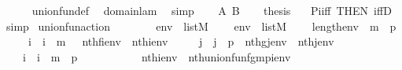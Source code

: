 \begin{isabellebody}
\ \ \ \ \isamarkupfalse%
\ union{\isacharunderscore}{\kern0pt}fun{\isacharunderscore}{\kern0pt}def\ \isamarkupfalse%
\ domain{\isacharunderscore}{\kern0pt}lam\ \isamarkupfalse%
\ simp\isanewline
\ \ \isamarkupfalse%
\ A\ B\isanewline
\ \ \isamarkupfalse%
\ {\isacharquery}{\kern0pt}thesis\ \isamarkupfalse%
\ \ Pi{\isacharunderscore}{\kern0pt}iff\ {\isacharbrackleft}{\kern0pt}THEN\ iffD{}{\isacharbrackright}{\kern0pt}\ \isamarkupfalse%
\ simp\isanewline
{}\isamarkupfalse%
%
\endisatagproof
{\isafoldproof}%
%
\isadelimproof
\isanewline
%
\endisadelimproof
\isanewline
{}\isamarkupfalse%
\ union{\isacharunderscore}{\kern0pt}fun{\isacharunderscore}{\kern0pt}action\ {\isacharcolon}{\kern0pt}\isanewline
\ \ \isanewline
\ \ \ \ {\isachardoublequoteopen}env\ {\isasymin}\ list{\isacharparenleft}{\kern0pt}M{\isacharparenright}{\kern0pt}{\isachardoublequoteclose}\isanewline
\ \ \ \ {\isachardoublequoteopen}env{\isacharprime}{\kern0pt}\ {\isasymin}\ list{\isacharparenleft}{\kern0pt}M{\isacharparenright}{\kern0pt}{\isachardoublequoteclose}\isanewline
\ \ \ \ {\isachardoublequoteopen}length{\isacharparenleft}{\kern0pt}env{\isacharparenright}{\kern0pt}\ {\isacharequal}{\kern0pt}\ m\ {\isasymunion}\ p{\isachardoublequoteclose}\isanewline
\ \ \ \ {\isachardoublequoteopen}{\isasymforall}\ i\ {\isachardot}{\kern0pt}\ i\ {\isasymin}\ m\ {\isasymlongrightarrow}\ \ nth{\isacharparenleft}{\kern0pt}f{\isacharbackquote}{\kern0pt}i{\isacharcomma}{\kern0pt}env{\isacharprime}{\kern0pt}{\isacharparenright}{\kern0pt}\ {\isacharequal}{\kern0pt}\ nth{\isacharparenleft}{\kern0pt}i{\isacharcomma}{\kern0pt}env{\isacharparenright}{\kern0pt}{\isachardoublequoteclose}\isanewline
\ \ \ \ {\isachardoublequoteopen}{\isasymforall}\ j\ {\isachardot}{\kern0pt}\ j\ {\isasymin}\ p\ {\isasymlongrightarrow}\ nth{\isacharparenleft}{\kern0pt}g{\isacharbackquote}{\kern0pt}j{\isacharcomma}{\kern0pt}env{\isacharprime}{\kern0pt}{\isacharparenright}{\kern0pt}\ {\isacharequal}{\kern0pt}\ nth{\isacharparenleft}{\kern0pt}j{\isacharcomma}{\kern0pt}env{\isacharparenright}{\kern0pt}{\isachardoublequoteclose}\isanewline
\ \ \ {\isachardoublequoteopen}{\isasymforall}\ i\ {\isachardot}{\kern0pt}\ i\ {\isasymin}\ m\ {\isasymunion}\ p\ {\isasymlongrightarrow}\isanewline
\ \ \ \ \ \ \ \ \ \ nth{\isacharparenleft}{\kern0pt}i{\isacharcomma}{\kern0pt}env{\isacharparenright}{\kern0pt}\ {\isacharequal}{\kern0pt}\ nth{\isacharparenleft}{\kern0pt}union{\isacharunderscore}{\kern0pt}fun{\isacharparenleft}{\kern0pt}f{\isacharcomma}{\kern0pt}g{\isacharcomma}{\kern0pt}m{\isacharcomma}{\kern0pt}p{\isacharparenright}{\kern0pt}{\isacharbackquote}{\kern0pt}i{\isacharcomma}{\kern0pt}env{\isacharprime}{\kern0pt}{\isacharparenright}{\kern0pt}{\isachardoublequoteclose}\isanewline

\end{isabellebody}
